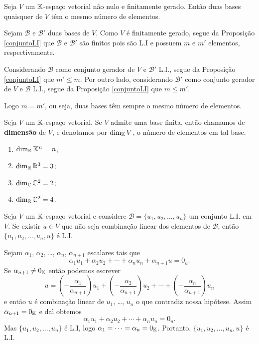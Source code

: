 \begin{corolario}
	Seja $V$ um $\mathbb{K}$-espa\c{c}o vetorial n\~ao nulo e finitamente gerado. Ent\~ao duas bases quaisquer de $V$ t\^em o mesmo n\'umero de elementos.
\end{corolario}
\begin{prova}
	Sejam $\mathcal{B}$ e $\mathcal{B}'$ duas bases de $V$. Como $V$ \'e finitamente gerado, segue da Proposi\c{c}\~ao \ref{conjuntoLI} que $\mathcal{B}$ e $\mathcal{B}'$ s\~ao finitos pois s\~ao L.I e possuem $m$ e $m'$ elementos, respectivamente.

	Considerando $\mathcal{B}$ como conjunto gerador de $V$ e $\mathcal{B}'$ L.I., segue da Proposi\c{c}\~ao \ref{conjuntoLI} que $m' \le m$. Por outro lado, considerando $\mathcal{B}'$ como conjunto gerador de $V$ e $\mathcal{B}$ L.I., segue da Proposi\c{c}\~ao \ref{conjuntoLI} que $m
	\le m'$.

	Logo $m = m'$, ou seja, duas bases t\^em sempre o mesmo n\'umero de elementos.
\end{prova}

\begin{definicao}
	Seja $V$ um $\mathbb{K}$-espa\c{c}o vetorial. Se $V$ admite uma base finita, ent\~ao chamamos de \textbf{dimens\~ao} de $V$, e denotamos por $\dim_{\mathbb{K}} V$, o n\'umero de elementos em tal base.
\end{definicao}

\begin{exemplo}
	\begin{enumerate}[label={\arabic*})]
		\item $\dim_{\mathbb{K}}\mathbb{K}^n = n$;
		\item $\dim_{\mathbb{R}}\mathbb{R}^3 = 3$;
		\item $\dim_{\mathbb{C}}\mathbb{C}^2 = 2$;
		\item $\dim_{\mathbb{R}}\mathbb{C}^2 = 4$.
	\end{enumerate}
\end{exemplo}


\begin{proposicao}\label{ampliarconjuntoLI}
	Seja $V$ um $\mathbb{K}$-espa\c{c}o vetorial e considere $\mathcal{B} = \{u_1, u_2, \dots, u_n\}$ um conjunto L.I. em $V$. Se existir $u \in V$ que n\~ao seja combina\c{c}\~ao linear dos elementos de $\mathcal{B}$, ent\~ao $\{u_1, u_2, \dots, u_n, u\}$ \'e L.I.
\end{proposicao}
\begin{prova}
	Sejam $\alpha_1$, $\alpha_2$, \dots, $\alpha_n$, $\alpha_{n + 1}$ escalares tais que
	\[
		\alpha_1u_1 + \alpha_2u_2 + \cdots + \alpha_nu_n + \alpha_{n + 1}u = 0_u.
	\]
	Se $\alpha_{n + 1} \ne 0_{\mathbb{K}}$ ent\~ao podemos escrever
	\[
		u = \left(-\dfrac{\alpha_1}{\alpha_{n + 1}}\right)u_1 + \left(-\dfrac{\alpha_2}{\alpha_{n + 1}}\right)u_2 + \cdots + \left(-\dfrac{\alpha_n}{\alpha_{n + 1}}\right)u_n
	\]
	e ent\~ao $u$ \'e combina\c{c}\~ao linear de $u_1$, \dots, $u_n$ o que contradiz nossa hip\'otese. Assim $\alpha_{n + 1} = 0_{\mathbb{K}}$ e da{\'\i} obtemos
	\[
		\alpha_1u_1 + \alpha_2u_2 + \cdots + \alpha_nu_n = 0_u.
	\]
	Mas $\{u_1, u_2, \dots, u_n\}$ \'e L.I, logo $\alpha_1 = \cdots = \alpha_n = 0_{\mathbb{K}}$. Portanto, $\{u_1, u_2, \dots, u_n, u\}$ \'e L.I.
\end{prova}


